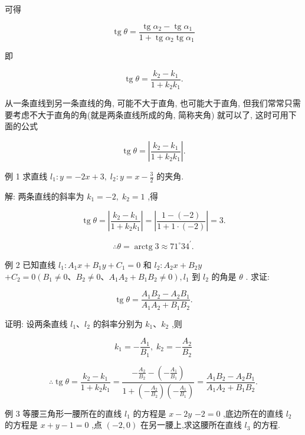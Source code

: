 \documentclass[lang=cn,newtx,12pt,scheme=chinese]{elegantbook}
\begin{document}
可得

\[
  \operatorname{tg}\theta = \frac{\operatorname{tg}{\alpha }_{2} - \operatorname{tg}{\alpha }_{1}}{1 + \operatorname{tg}{\alpha }_{2}\operatorname{tg}{\alpha }_{1}}
\]

即

\[
  \operatorname{tg}\theta = \frac{{k}_{2} - {k}_{1}}{1 + {k}_{2}{k}_{1}}.
\]
\begin{corollary}
从一条直线到另一条直线的角, 可能不大于直角, 也可能大于直角, 但我们常常只需要考虑不大于直角的角(就是两条直线所成的角, 简称夹角) 就可以了, 这时可用下面的公式

\[
  \operatorname{tg}\theta = \left| \frac{{k}_{2} - {k}_{1}}{1 + {k}_{2}{k}_{1}}\right| .
\]
\end{corollary}
例 1 求直线 \({l}_{1} : y = - {2x} + 3,\;{l}_{2} : y = x - \frac{3}{2}\) 的夹角.

解: 两条直线的斜率为 \({k}_{1} = - 2,\;{k}_{2} = 1\) ,得

\[
  \operatorname{tg}\theta = \left| \frac{{k}_{2} - {k}_{1}}{1 + {k}_{2}{k}_{1}}\right| = \left| \frac{1 - \left( {-2}\right) }{1 + 1 \cdot \left( {-2}\right) }\right| = 3.
\]

\[
  \therefore \theta = \operatorname{arctg}3 \approx {71}^{ \circ }{34}^{\prime }\text{.}
\]

例 2 已知直线 \({l}_{1} : {A}_{1}x + {B}_{1}y + {C}_{1} = 0\) 和 \({l}_{2} : {A}_{2}x + {B}_{2}y\) \(+ {C}_{2} = 0\left( {{B}_{1} \neq 0\text{、}{B}_{2} \neq 0\text{、}{A}_{1}{A}_{2} + {B}_{1}{B}_{2} \neq 0}\right) ,{l}_{1}\) 到 \({l}_{2}\) 的角是 \(\theta\) . 求证:

\[
  \operatorname{tg}\theta = \frac{{A}_{1}{B}_{2} - {A}_{2}{B}_{1}}{{A}_{1}{A}_{2} + {B}_{1}{B}_{2}}.
\]

证明: 设两条直线 \({l}_{1}\text{、}{l}_{2}\) 的斜率分别为 \({k}_{1}\text{、}{k}_{2}\) ,则

\[
    {k}_{1} = - \frac{{A}_{1}}{{B}_{1}},\;{k}_{2} = - \frac{{A}_{2}}{{B}_{2}}
\]

\[
  \therefore \operatorname{tg}\theta = \frac{{k}_{2} - {k}_{1}}{1 + {k}_{2}{k}_{1}} = \frac{-\frac{{A}_{2}}{{B}_{2}} - \left( {-\frac{{A}_{1}}{{B}_{1}}}\right) }{1 + \left( {-\frac{{A}_{2}}{{B}_{2}}}\right) \left( {-\frac{{A}_{1}}{{B}_{1}}}\right) } = \frac{{A}_{1}{B}_{2} - {A}_{2}{B}_{1}}{{A}_{1}{A}_{2} + {B}_{1}{B}_{2}}\text{.}
\]

例 3 等腰三角形一腰所在的直线 \({l}_{1}\) 的方程是 \(x - {2y}\) \(- 2 = 0\) ,底边所在的直线 \({l}_{2}\) 的方程是 \(x + y - 1 = 0\) ,点 \(\left( {-2,0}\right)\) 在另一腰上,求这腰所在直线 \({l}_{3}\) 的方程.
\end{document}
